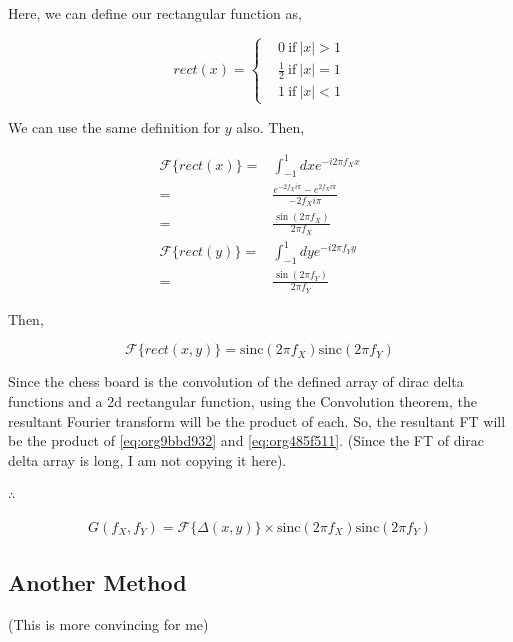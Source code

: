 \documentclass[a4paper,11pt]{article}
\begin{document}
Here, we can define our rectangular function as,

\begin{equation}
rect(x) = \begin{cases} & 0~ \text{if}~ |x| > 1 \\
& \frac{1}{2}~ \text{if}~ |x| = 1\\
& 1~ \text{if}~ |x| < 1
\end{cases}
\end{equation}

We can use the same definition for \(y\) also. Then,

\begin{equation}
\label{eq:org5761302}
\begin{split}
\mathcal{F}\{rect(x)\} = & \int_{-1}^1 dx e^{-i2\pi f_X x} \\
= & \frac{e^{-2 f_X i \pi}-e^{2 f_X i \pi}}{-2 f_X i \pi} \\
= & \frac{\sin (2\pi f_X)}{2\pi f_X} \\
\mathcal{F}\{rect(y)\} = & \int_{-1}^1 dy e^{-i2\pi f_Y y} \\
= & \frac{\sin (2\pi f_Y)}{2\pi f_Y}
\end{split}
\end{equation}

Then,

\begin{equation}
\label{eq:org485f511}
\mathcal{F}\{rect(x,y)\} = \text{sinc}(2\pi f_X)\text{sinc}(2\pi f_Y)
\end{equation}

Since the chess board is the convolution of the defined array of dirac delta functions and a 2d rectangular function, using the Convolution theorem, the resultant Fourier transform will be the product of each. So, the resultant FT will be the product of \ref{eq:org9bbd932} and \ref{eq:org485f511}. (Since the FT of dirac delta array is long, I am not copying it here).

\(\therefore\)

\begin{equation}
\begin{split}
G(f_X,f_Y) = \mathcal{F}\{\Delta(x,y)\} \times  \text{sinc}(2\pi f_X)\text{sinc}(2\pi f_Y)
\end{split}
\end{equation}

\subsection*{Another Method}
\label{sec:org23998b5}
(This is more convincing for me)
\end{document}
